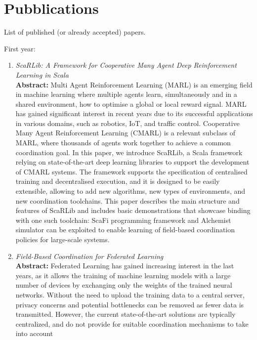 \documentclass[runningheads]{llncs}
\begin{document}
\section{Pubblications}
List of published (or already accepted) papers.

\noindent
First year:
\begin{enumerate}
    \item \emph{ScaRLib: A Framework for Cooperative Many Agent Deep Reinforcement Learning in Scala}~\cite{DBLP:conf/coordination/DominiCAV23} \\
    \textbf{Abstract: }
    Multi Agent Reinforcement Learning (MARL) is an emerging field in machine learning where multiple agents learn, simultaneously and in a shared environment, 
     how to optimise a global or local reward signal. MARL has gained significant interest in recent years due to its successful applications in various domains,
     such as robotics, IoT, and traffic control. Cooperative Many Agent Reinforcement Learning (CMARL) is a relevant subclass of MARL, where thousands of 
     agents work together to achieve a common coordination goal.
    In this paper, we introduce ScaRLib, a Scala framework relying on state-of-the-art deep learning libraries to support the development of CMARL systems. 
    The framework supports the specification of centralised training and decentralised execution, and it is designed to be easily extensible, allowing to add new 
     algorithms, new types of environments, and new coordination toolchains.
    This paper describes the main structure and features of ScaRLib and includes basic demonstrations that showcase binding with one such toolchain: 
     ScaFi programming framework and Alchemist simulator can be exploited to enable learning of field-based coordination policies for large-scale systems.
    \item \emph{Field-Based Coordination for Federated Learning}~\cite{DBLP:conf/coordination/DominiAEV24} \\
    \textbf{Abstract: }
    Federated Learning has gained increasing interest in the last years, as it allows the training of machine learning models with a large number of devices 
     by exchanging only the weights of the trained neural networks. 
    Without the need to upload the training data to a central server, privacy concerns and potential bottlenecks can be removed as fewer data is transmitted. 
    However, the current state-of-the-art solutions are typically centralized, and do not provide for suitable coordination mechanisms to take into account 

\end{enumerate}
\end{document}
